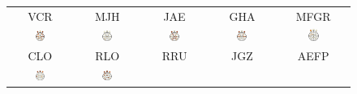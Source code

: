 \begin{figure}
\centering
\begin{tabular}{ccccc}
VCR & MJH & JAE & GHA & MFGR \\
\includegraphics[width=0.17\textwidth]{./img_art_dfa/cabeza_new_VCR_30.pdf} &
\includegraphics[width=0.17\textwidth]{./img_art_dfa/cabeza_new_MJH_30.pdf} &
\includegraphics[width=0.17\textwidth]{./img_art_dfa/cabeza_new_JAE_30.pdf} &
\includegraphics[width=0.17\textwidth]{./img_art_dfa/cabeza_new_GHA_30.pdf} &
\includegraphics[width=0.17\textwidth]{./img_art_dfa/cabeza_new_MFGR_30.pdf} \\
\midrule
CLO & RLO & RRU & JGZ & AEFP \\
\includegraphics[width=0.17\textwidth]{./img_art_dfa/cabeza_new_CLO_30.pdf} &
\includegraphics[width=0.17\textwidth]{./img_art_dfa/cabeza_new_RLO_30.pdf} &

\end{tabular}
\end{figure}
